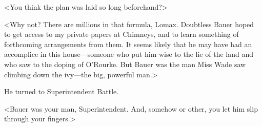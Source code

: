<You think the plan was laid so long beforehand?>

<Why not? There are millions in that formula, Lomax. Doubtless Bauer hoped to get access to my private papers at Chimneys, and to learn something of forthcoming arrangements from them. It seems likely that he may have had an accomplice in this house—someone who put him wise to the lie of the land and who saw to the doping of O'Rourke. But Bauer was the man Miss Wade saw climbing down the ivy—the big, powerful man.>

He turned to Superintendent Battle.

<Bauer was your man, Superintendent. And, somehow or other, you let him slip through your fingers.>